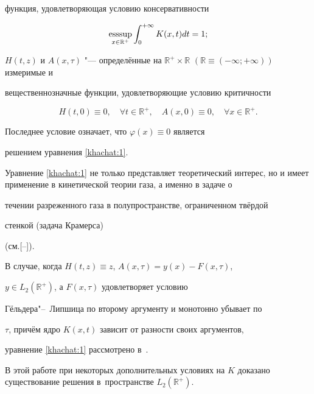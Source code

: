функция, удовлетворяющая условию консервативности

\begin{equation}

\mathop{\rm esssup}\limits_{x\in \mathbb{R}^+}

\int _0^{+\infty}K(x,t)dt=1;

\label{khachat:2}

\end{equation}

$H(t,z)$ и $A(x,\tau)$ "--- определённые на $\mathbb{R}^+\times

\mathbb{R}$ $(\mathbb{R}\equiv(-\infty;+\infty))$ измеримые и

вещественнозначные функции, удовлетворяющие условию критичности

\begin{equation}

H(t,0)\equiv0,\quad \forall t\in\mathbb{R}^+,\quad

A(x,0)\equiv0,\quad \forall x\in\mathbb{R}^+.\label{khachat:3}

\end{equation}

Последнее условие означает, что $\varphi(x)\equiv0$ является

решением уравнения \eqref{khachat:1}.



Уравнение \eqref{khachat:1} не только представляет теоретический интерес, но и имеет применение в кинетической теории газа, а именно в задаче о

течении разреженного газа в полупространстве, ограниченном твёрдой

стенкой (задача Крамерса)

\mbox{(см.[--]).}



В случае, когда $H(t,z)\equiv z$, $A(x,\tau)=y(x)-F(x,\tau)$,

$y\in L_2(\mathbb{R}^+)$, а $F(x,\tau)$ удовлетворяет условию

Гёльдера"--~Липшица по второму аргументу и монотонно убывает по

$\tau$, причём ядро $K(x,t)$ зависит от разности своих аргументов,

уравнение \eqref{khachat:1} рассмотрено в~\cite{popovkoval:bib:Milojevic}. 

В этой работе при некоторых дополнительных условиях на $K$ доказано существование решения в~пространстве $L_2(\mathbb{R}^+)$.



